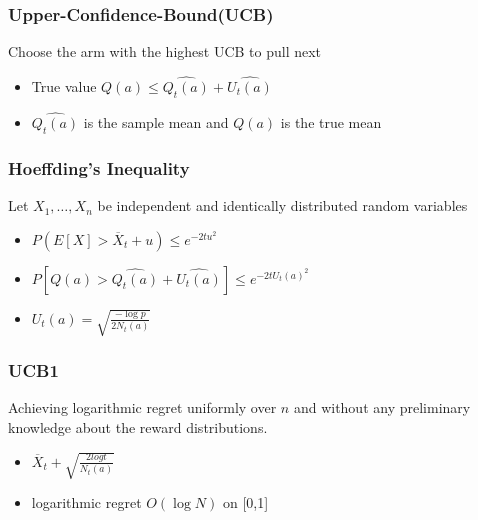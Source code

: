 \documentclass{beamer}
\title{}
\subtitle{}
\author{}
\institute{}
\date{}
\begin{document}
    \begin{frame}
        \frametitle{Upper-Confidence-Bound(UCB)}
        Choose the arm with the highest UCB to pull next \footnotemark

        \begin{itemize}
            \item<1-> True value $ Q(a)  \leq \widehat{Q_t (a)}+\widehat{U_t (a)} $
            \item<2->  $ \widehat{Q_t (a)}$ is the sample mean and $ Q(a)$ is the true mean
        \end{itemize}
    \end{frame}


    \begin{frame}
        \frametitle{Hoeffding’s Inequality}
        Let $X_1, \dots, X_n$ be independent and identically distributed random variables \footnotemark[1]

        \begin{itemize}
            \item<1-> $ P(E[X] > \overline  X_t + u) \leq e^{-2t u^2}$
            \item<2-> $P[Q(a) >\widehat{Q_t (a)}+\widehat{U_t (a)}] \leq e^{-2t U_t(a)^2}$
            \item<3-> $U_t(a) = \sqrt{\frac{-\log p}{2N_t (a)}}$
        \end{itemize}
    \end{frame}



    \begin{frame}
        \frametitle{UCB1}
        Achieving logarithmic regret uniformly over $n$ and without any preliminary knowledge about the reward distributions.

        \begin{itemize}
            \item<1-> $\overline X_t + \sqrt{\frac{2log t}{N_t (a)}}$ \footnotemark[1]
            \item<2-> logarithmic regret $O(\log N)$ on [0,1] \footnotemark[2]

        \end{itemize}
    \end{frame}
\end{document}
